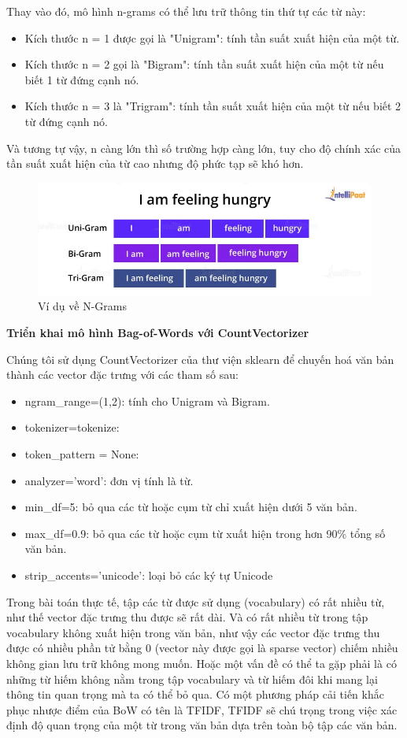 \documentclass[12pt,a4paper,oneside]{book}
\begin{document}
	Thay vào đó, mô hình n-grams có thể lưu trữ thông tin thứ tự các từ này:
	\begin{itemize}
		\item Kích thước n = 1 được gọi là "Unigram": tính tần suất xuất hiện của một từ.
		\item Kích thước n = 2 gọi là "Bigram": tính tần suất xuất hiện của một từ nếu biết 1 từ đứng cạnh nó.
		\item Kích thước n = 3 là "Trigram": tính tần suất xuất hiện của một từ nếu biết 2 từ đứng cạnh nó.
	\end{itemize}
	Và tương tự vậy, n càng lớn thì số trường hợp càng lớn, tuy cho độ chính xác của tần suất xuất hiện của từ cao nhưng độ phức tạp sẽ khó hơn. 
	\begin{figure}[H]
		\begin{center}
			\includegraphics[width=0.8\columnwidth]{ngrams.jpg}
		\end{center}
		\caption{Ví dụ về N-Grams}
	\end{figure}
	
	
	\textbf{Triển khai mô hình Bag-of-Words với CountVectorizer}
	
	Chúng tôi sử dụng CountVectorizer của thư viện sklearn để chuyến hoá văn bản thành các vector đặc trưng với các tham số sau:
	\begin{itemize}
		\item ngram\_range=(1,2): tính cho Unigram và Bigram.
		\item tokenizer=tokenize: 
		\item token\_pattern = None: 
		\item analyzer='word': đơn vị tính là từ.
		\item min\_df=5: bỏ qua các từ hoặc cụm từ chỉ xuất hiện dưới 5 văn bản.
		\item max\_df=0.9: bỏ qua các từ hoặc cụm từ xuất hiện trong hơn 90\% tổng số văn bản.
		\item strip\_accents='unicode': loại bỏ các ký tự Unicode
	\end{itemize}
	
	Trong bài toán thực tế, tập các từ được sử dụng (vocabulary) có rất nhiều từ, như thế vector đặc trưng thu được sẽ rất dài. Và có rất nhiều từ trong tập vocabulary không xuất hiện trong văn bản, như vậy các vector đặc trưng thu được có nhiều phần tử bằng 0 (vector này được gọi là sparse vector) chiếm nhiều không gian lưu trữ không mong muốn. Hoặc một vấn đề có thể ta gặp phải là có những từ hiếm không nằm trong tập vocabulary và từ hiếm đôi khi mang lại thông tin quan trọng mà ta có thể bỏ qua. Có một phương pháp cải tiến khắc phục nhược điểm của BoW có tên là TFIDF, TFIDF sẽ chú trọng trong việc xác định độ quan trọng của một từ trong văn bản dựa trên toàn bộ tập các văn bản. 
	
\end{document}
